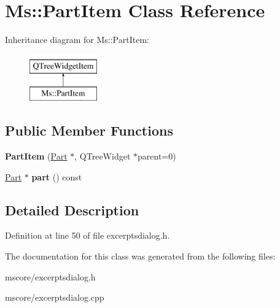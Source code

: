\hypertarget{class_ms_1_1_part_item}{}\section{Ms\+:\+:Part\+Item Class Reference}
\label{class_ms_1_1_part_item}
Inheritance diagram for Ms\+:\+:Part\+Item\+:\begin{figure}[H]
\begin{center}
\leavevmode
\includegraphics[height=2.000000cm]{class_ms_1_1_part_item}
\end{center}
\end{figure}
\subsection*{Public Member Functions}
\begin{DoxyCompactItemize}
\item 
\mbox{\label{class_ms_1_1_part_item_a5914367d7c285a989bc3cfddd28c7ba1}} 
{\bfseries Part\+Item} (\hyperlink{class_ms_1_1_part}{Part} $\ast$, Q\+Tree\+Widget $\ast$parent=0)
\item 
\mbox{\label{class_ms_1_1_part_item_a8f3b226cc409a5e9ff91d2257c338f68}} 
\hyperlink{class_ms_1_1_part}{Part} $\ast$ {\bfseries part} () const
\end{DoxyCompactItemize}


\subsection{Detailed Description}


Definition at line 50 of file excerptsdialog.\+h.



The documentation for this class was generated from the following files\+:\begin{DoxyCompactItemize}
\item 
mscore/excerptsdialog.\+h\item 
mscore/excerptsdialog.\+cpp\end{DoxyCompactItemize}
